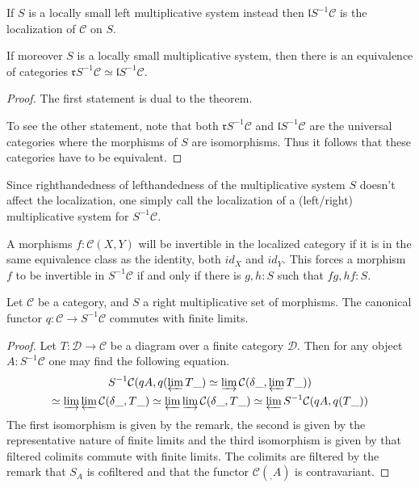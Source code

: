     \begin{corollary}
        If $S$ is a locally small left multiplicative system instead then $\mathfrak{l}S^{-1}\mathcal{C}$ is the localization of $\mathcal{C}$ on $S$.

        If moreover $S$ is a locally small multiplicative system, then there is an equivalence of categories $\mathfrak{r}S^{-1}\mathcal{C}\simeq\mathfrak{l}S^{-1}\mathcal{C}$.
    \end{corollary}

    \begin{proof}
        The first statement is dual to the theorem.

        To see the other statement, note that both $\mathfrak{r}S^{-1}\mathcal{C}$ and $\mathfrak{l}S^{-1}\mathcal{C}$ are the universal categories where the morphisms of $S$ are isomorphisms. Thus it follows that these categories have to be equivalent.
    \end{proof}

    \begin{remark}
        Since righthandedness of lefthandedness of the multiplicative system $S$ doesn't affect the localization, one simply call the localization of a (left/right) multiplicative system for $S^{-1}\mathcal{C}$.
    \end{remark}

    \begin{remark}
        A morphisms $f:\mathcal{C}(X,Y)$ will be invertible in the localized category if it is in the same equivalence class as the identity, both $id_X$ and $id_Y$. This forces a morphism $f$ to be invertible in $S^{-1}\mathcal{C}$ if and only if there is $g,h:S$ such that $fg,hf:S$.
    \end{remark}

    \begin{prop}
        Let $\mathcal{C}$ be a category, and $S$ a right multiplicative set of morphisms. The canonical functor $q:\mathcal{C}\rightarrow S^{-1}\mathcal{C}$ commutes with finite limits.
    \end{prop}

    \begin{proof}
        Let $T:\mathcal{D}\rightarrow\mathcal{C}$ be a diagram over a finite category $\mathcal{D}$. Then for any object $A:S^{-1}\mathcal{C}$ one may find the following equation.
        \begin{multline*}
            S^{-1}\mathcal{C}(qA,q(\varprojlim T\_)\simeq \varinjlim\mathcal{C}(\delta\_,\varprojlim T\_))\\
            \simeq \varinjlim\varprojlim\mathcal{C}(\delta\_,T\_)\simeq \varprojlim\varinjlim\mathcal{C}(\delta\_,T\_)\simeq \varprojlim S^{-1}\mathcal{C}(qA,q(T\_))
        \end{multline*}
        The first isomorphism is given by the remark, the second is given by the representative nature of finite limits and the third isomorphism is given by that filtered colimits commute with finite limits. The colimits are filtered by the remark that $S_A$ is cofiltered and that the functor $\mathcal{C}(_,A)$ is contravariant.
    \end{proof}


